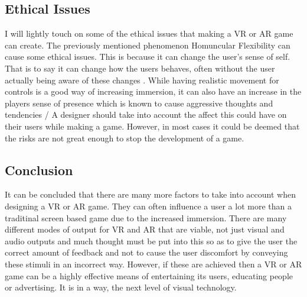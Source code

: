 \documentclass{scrartcl}
\begin{document}
\subsection{Ethical Issues}
I will lightly touch on some of the ethical issues that making a VR or AR game can create. The previously mentioned phenomenon Homuncular Flexibility can cause some ethical issues. This is because it can change the user's sense of self. That is to say it can change how the users behaves, often without the user actually being aware of these changes \cite{madary2016real}. While having realistic movement for controls is a good way of increasing immersion, it can also have an increase in the players sense of presence which is known to cause aggressive thoughts and tendencies \cite{fumhe2015violent}/ A designer should take into account the affect this could have on their users while making a game. However, in most cases it could be deemed that the risks are not great enough to stop the development of a game.

\subsection{Conclusion}
It can be concluded that there are many more factors to take into account when designing a VR or AR game. They can often influence a user a lot more than a traditinal screen based game due to the increased immersion. There are many different modes of output for VR and AR that are viable, not just visual and audio outputs and much thought must be put into this so as to give the user the correct amount of feedback and not to cause the user discomfort by conveying these stimuli in an incorrect way. However, if these are achieved then a VR or AR game can be a highly effective means of entertaining its users, educating people or advertising. It is in a way, the next level of visual technology.





\end{document}
